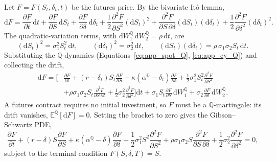 \documentclass[11pt, a4paper]{article}
\newcommand{\convyield}{\delta}             %
\newcommand{\meanrev}{\kappa}               %
\newcommand{\longrun}{\alpha}               %
\begin{document}
Let $F = F(S_t, \convyield_t, t)$ be the futures price. By the bivariate It\^{o} lemma,
\begin{equation}
  \label{eq:app_ito}
  \mathrm{d}F = \frac{\partial F}{\partial t}\,\mathrm{d}t
    + \frac{\partial F}{\partial S}\,\mathrm{d}S_t
    + \frac{\partial F}{\partial \convyield}\,\mathrm{d}\convyield_t
    + \frac{1}{2}\frac{\partial^2 F}{\partial S^2}(\mathrm{d}S_t)^2
    + \frac{\partial^2 F}{\partial S\,\partial \convyield}(\mathrm{d}S_t)(\mathrm{d}\convyield_t)
    + \frac{1}{2}\frac{\partial^2 F}{\partial \convyield^2}(\mathrm{d}\convyield_t)^2.
\end{equation}
\noindent
The quadratic-variation terms, with $\mathrm{d}W_1^{\mathbb{Q}}\,\mathrm{d}W_2^{\mathbb{Q}} = \rho\,\mathrm{d}t$, are
\begin{equation}
  \label{eq:app_qv}
  (\mathrm{d}S_t)^2 = \sigma_1^2 S_t^2\,\mathrm{d}t,
  \qquad
  (\mathrm{d}\convyield_t)^2 = \sigma_2^2\,\mathrm{d}t,
  \qquad
  (\mathrm{d}S_t)(\mathrm{d}\convyield_t) = \rho\,\sigma_1\sigma_2 S_t\,\mathrm{d}t.
\end{equation}
\noindent
Substituting the $\mathbb{Q}$-dynamics (Equations~\ref{eq:app_spot_Q}, \ref{eq:app_cy_Q}) and collecting the drift,
\begin{equation}
  \label{eq:app_dF}
  \begin{aligned}
  \mathrm{d}F = \Bigg[
    &\frac{\partial F}{\partial t}
    + (r - \convyield_t)S_t\frac{\partial F}{\partial S}
    + \meanrev(\longrun^{\mathbb{Q}} - \convyield_t)\frac{\partial F}{\partial \convyield}
    + \frac{1}{2}\sigma_1^2 S_t^2\frac{\partial^2 F}{\partial S^2} \\
    &+ \rho\sigma_1\sigma_2 S_t\frac{\partial^2 F}{\partial S\,\partial \convyield}
    + \frac{1}{2}\sigma_2^2\frac{\partial^2 F}{\partial \convyield^2}
  \Bigg]\mathrm{d}t
  + \sigma_1 S_t\frac{\partial F}{\partial S}\,\mathrm{d}W_1^{\mathbb{Q}}
  + \sigma_2\frac{\partial F}{\partial \convyield}\,\mathrm{d}W_2^{\mathbb{Q}}.
  \end{aligned}
\end{equation}
\noindent
A futures contract requires no initial investment, so $F$ must be a $\mathbb{Q}$-martingale: its drift vanishes, $\mathbb{E}^{\mathbb{Q}}[\mathrm{d}F] = 0$. Setting the bracket to zero gives the Gibson--Schwartz PDE,
\begin{equation}
  \label{eq:app_pde_calendar}
  \frac{\partial F}{\partial t}
  + (r - \convyield)S\frac{\partial F}{\partial S}
  + \meanrev(\longrun^{\mathbb{Q}} - \convyield)\frac{\partial F}{\partial \convyield}
  + \frac{1}{2}\sigma_1^2 S^2\frac{\partial^2 F}{\partial S^2}
  + \rho\sigma_1\sigma_2 S\frac{\partial^2 F}{\partial S\,\partial \convyield}
  + \frac{1}{2}\sigma_2^2\frac{\partial^2 F}{\partial \convyield^2} = 0,
\end{equation}
\noindent
subject to the terminal condition $F(S, \convyield, T) = S$.
\end{document}
